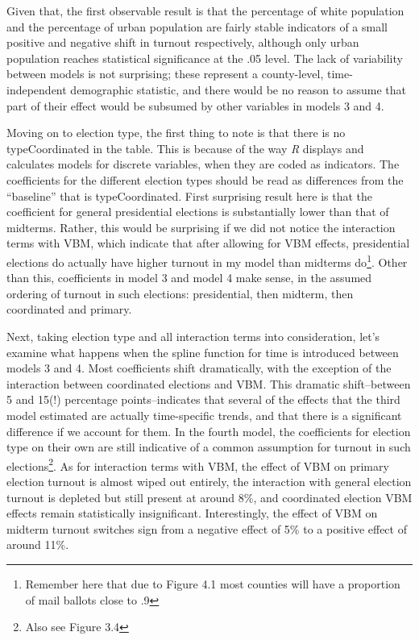 \documentclass[12pt,twoside]{reedthesis}
\begin{document}
  Given that, the first observable result is that the percentage of white
  population and the percentage of urban population are fairly stable
  indicators of a small positive and negative shift in turnout
  respectively, although only urban population reaches statistical
  significance at the .05 level. The lack of variability between models is
  not surprising; these represent a county-level, time-independent
  demographic statistic, and there would be no reason to assume that part
  of their effect would be subsumed by other variables in models 3 and 4.
  
  Moving on to election type, the first thing to note is that there is no
  typeCoordinated in the table. This is because of the way \textit{R}
  displays and calculates models for discrete variables, when they are
  coded as indicators. The coefficients for the different election types
  should be read as differences from the ``baseline'' that is
  typeCoordinated. First surprising result here is that the coefficient
  for general presidential elections is substantially lower than that of
  midterms. Rather, this would be surprising if we did not notice the
  interaction terms with VBM, which indicate that after allowing for VBM
  effects, presidential elections do actually have higher turnout in my
  model than midterms do\footnote{Remember here that due to Figure 4.1
    most counties will have a proportion of mail ballots close to .9}.
  Other than this, coefficients in model 3 and model 4 make sense, in the
  assumed ordering of turnout in such elections: presidential, then
  midterm, then coordinated and primary.
  
  Next, taking election type and all interaction terms into consideration,
  let's examine what happens when the spline function for time is
  introduced between models 3 and 4. Most coefficients shift dramatically,
  with the exception of the interaction between coordinated elections and
  VBM. This dramatic shift--between 5 and 15(!) percentage
  points--indicates that several of the effects that the third model
  estimated are actually time-specific trends, and that there is a
  significant difference if we account for them. In the fourth model, the
  coefficients for election type on their own are still indicative of a
  common assumption for turnout in such elections\footnote{Also see Figure
    3.4}. As for interaction terms with VBM, the effect of VBM on primary
  election turnout is almost wiped out entirely, the interaction with
  general election turnout is depleted but still present at around 8\%,
  and coordinated election VBM effects remain statistically insignificant.
  Interestingly, the effect of VBM on midterm turnout switches sign from a
  negative effect of 5\% to a positive effect of around 11\%.
  
\end{document}
